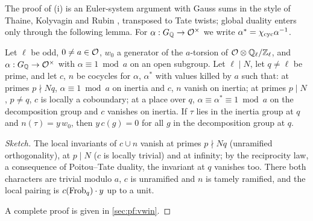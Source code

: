 The proof of (i) is an Euler-system argument with Gauss sums in the style of Thaine, Kolyvagin and Rubin
\cite{Thaine1988,Kolyvagin1990,Rubin1990}, transposed to Tate twists; global duality enters only through the
following lemma. For $\alpha:G_{\mathbb{Q}}\to\mathcal{O}^\times$ we write $\alpha^*=\chi_{\mathrm{cyc}}\alpha^{-1}$.

\begin{lemma}\Fmark\label{lem:window:rec}
Let $\ell$ be odd, $0\ne a\in\mathcal{O}$, $w_0$ a generator of the $a$-torsion of $\mathcal{O}\otimes\mathbb{Q}_\ell/\mathbb{Z}_\ell$, and
$\alpha:G_{\mathbb{Q}}\to\mathcal{O}^\times$ with $\alpha\equiv1\bmod a$ on an open subgroup. Let $\ell\mid N$, let $q\ne\ell$ be
prime, and let $c$, $n$ be cocycles for $\alpha$, $\alpha^*$ with values killed by $a$ such that: at primes
$p\nmid Nq$, $\alpha\equiv1\bmod a$ on inertia and $c$, $n$ vanish on inertia; at primes $p\mid N$, $p\ne q$, $c$ is
locally a coboundary; at a place over $q$, $\alpha\equiv\alpha^*\equiv1\bmod a$ on the decomposition group and $c$
vanishes on inertia. If $\tau$ lies in the inertia group at $q$ and $n(\tau)=y\,w_0$, then $y\,c(g)=0$ for all $g$
in the decomposition group at $q$.
\end{lemma}

\begin{proof}[Sketch]
The local invariants of $c\cup n$ vanish at primes $p\nmid Nq$ (unramified orthogonality), at $p\mid N$ ($c$ is
locally trivial) and at infinity; by the reciprocity law, a consequence of Poitou--Tate duality, the invariant at
$q$ vanishes too. There both characters are trivial modulo $a$, $c$ is unramified and $n$ is tamely ramified, and
the local pairing is $c(\operatorname{Frob}_q)\cdot y$ up to a unit.

A complete proof is given in \cref{sec:pf:vwin}.
\end{proof}

